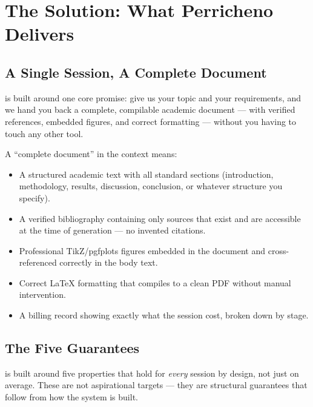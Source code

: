 \section{The Solution: What Perricheno Delivers}
\label{sec:solution}

\subsection{A Single Session, A Complete Document}

\sys{} is built around one core promise: give us your topic and your requirements,
and we hand you back a complete, compilable academic document — with verified references,
embedded figures, and correct formatting — without you having to touch any other tool.

A ``complete document'' in the \sys{} context means:

\begin{itemize}
  \item A structured academic text with all standard sections (introduction,
        methodology, results, discussion, conclusion, or whatever structure you specify).
  \item A verified bibliography containing only sources that exist and are accessible
        at the time of generation — no invented citations.
  \item Professional TikZ/pgfplots figures embedded in the document and cross-referenced
        correctly in the body text.
  \item Correct \LaTeX{} formatting that compiles to a clean PDF without manual intervention.
  \item A billing record showing exactly what the session cost, broken down by stage.
\end{itemize}

\subsection{The Five Guarantees}

\sys{} is built around five properties that hold for \emph{every} session by design,
not just on average.
These are not aspirational targets — they are structural guarantees that follow from
how the system is built.

